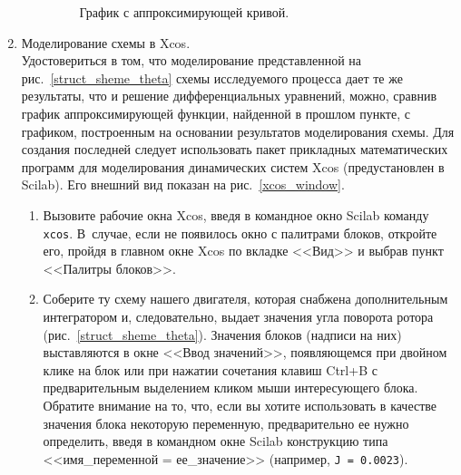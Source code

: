 \documentclass[12pt,a4paper,openany]{extarticle}
\begin{document}
\begin{enumerate}
\begin{enumerate}
\begin{figure}[h]
	\noindent{}
	\caption{График с аппроксимирующей кривой.}
	\label{second_graph}
\end{figure}
\end{enumerate}
\item Моделирование схемы в Xcos.\label{xcos_part}\\
Удостовериться в том, что моделирование представленной на рис.~\ref{struct_sheme_theta} схемы исследуемого процесса дает те же результаты, что и решение дифференциальных уравнений, можно, сравнив график аппроксимирующей функции, найденной в прошлом пункте, с графиком, построенным на основании результатов моделирования схемы. 
Для создания последней следует использовать пакет прикладных математических программ для моделирования динамических систем Xcos (предустановлен в Scilab). 
Его внешний вид показан на рис.~\ref{xcos_window}.
\begin{enumerate}
\item Вызовите рабочие окна Xcos, введя в командное окно Scilab команду \verb|xcos|. 
В~случае, если не появилось окно с палитрами блоков, откройте его, пройдя в главном окне Xcos по вкладке <<Вид>> и выбрав пункт <<Палитры блоков>>. 
\item Соберите ту схему нашего двигателя, которая снабжена дополнительным интегратором и, следовательно, выдает значения угла поворота ротора (рис.~\ref{struct_sheme_theta}). 
Значения блоков (надписи на них) выставляются в окне <<Ввод значений>>, появляющемся при двойном клике на блок или при нажатии сочетания клавиш Ctrl+B с предварительным выделением кликом мыши интересующего блока. 
Обратите внимание на то, что, если вы хотите использовать в качестве значения блока некоторую переменную, предварительно ее нужно определить, введя в командном окне Scilab конструкцию типа <<имя\_переменной = ее\_значение>> (например, \verb|J = 0.0023|). 


\end{enumerate}
\end{enumerate}
\end{document}

